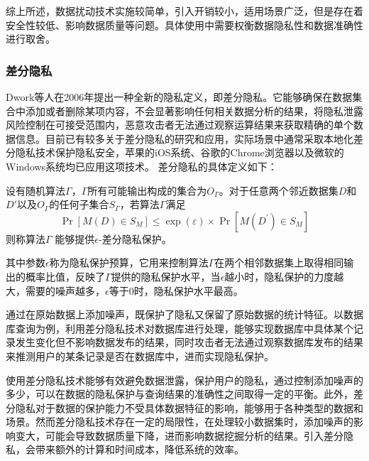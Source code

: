 综上所述，数据扰动技术实施较简单，引入开销较小，适用场景广泛，但是存在着安全性较低、影响数据质量等问题。具体使用中需要权衡数据隐私性和数据准确性进行取舍。

\subsubsection{差分隐私}
Dwork等人\cite{dwork2006differential}在2006年提出一种全新的隐私定义，即差分隐私。它能够确保在数据集合中添加或者删除某项内容，不会显著影响任何相关数据分析的结果\cite{dwork2008differential}，将隐私泄露风险控制在可接受范围内，恶意攻击者无法通过观察运算结果来获取精确的单个数据信息。目前已有较多关于差分隐私的研究和应用，实际场景中通常采取本地化差分隐私技术保护隐私安全，苹果的iOS系统\cite{team2017learning}、谷歌的Chrome浏览器\cite{erlingsson2014rappor}以及微软的Windows系统\cite{ding2017collecting}均已应用这项技术。
差分隐私的具体定义\cite{dwork2011firm}如下：

\begin{definition}
	设有随机算法$ \varGamma $，$ \varGamma $所有可能输出构成的集合为$ O_{\varGamma} $。对于任意两个邻近数据集$ D $和$ D' $以及$ O_{\varGamma} $的任何子集合$ S_{\varGamma} $，若算法$ \varGamma $满足
	\begin{equation}
		\operatorname{Pr}\left[M(D) \in S_M\right] \leq \exp (\varepsilon) \times \operatorname{Pr}\left[M\left(D^{\prime}\right) \in S_M\right]
	\end{equation}
	则称算法$ \varGamma $ 能够提供$ \epsilon$-差分隐私保护。
\end{definition}

其中参数$ \epsilon $称为隐私保护预算，它用来控制算法$ \varGamma $在两个相邻数据集上取得相同输出的概率比值，反映了$ \varGamma $提供的隐私保护水平，当$ \epsilon $越小时，隐私保护的力度越大，需要的噪声越多，$ \epsilon $等于0时，隐私保护水平最高。

通过在原始数据上添加噪声，既保护了隐私又保留了原始数据的统计特征。以数据库查询为例，利用差分隐私技术对数据库进行处理，能够实现数据库中具体某个记录发生变化但不影响数据发布的结果，同时攻击者无法通过观察数据库发布的结果来推测用户的某条记录是否在数据库中，进而实现隐私保护。

使用差分隐私技术能够有效避免数据泄露，保护用户的隐私，通过控制添加噪声的多少，可以在数据的隐私保护与查询结果的准确性之间取得一定的平衡。此外，差分隐私对于数据的保护能力不受具体数据特征的影响，能够用于各种类型的数据和场景。然而差分隐私技术存在一定的局限性，在处理较小数据集时，添加噪声的影响变大，可能会导致数据质量下降，进而影响数据挖掘分析的结果。引入差分隐私，会带来额外的计算和时间成本，降低系统的效率。

